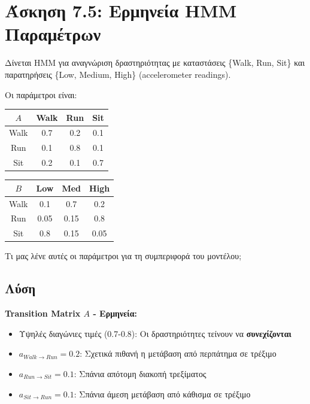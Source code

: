 \section{Άσκηση 7.5: Ερμηνεία HMM Παραμέτρων}

\begin{formulabox}[Εκφώνηση]
Δίνεται HMM για αναγνώριση δραστηριότητας με καταστάσεις \{Walk, Run, Sit\} και
παρατηρήσεις \{Low, Medium, High\} (accelerometer readings).

Οι παράμετροι είναι:
\begin{center}
\begin{tabular}{c|ccc}
$A$ & Walk & Run & Sit \\
\hline
Walk & 0.7 & 0.2 & 0.1 \\
Run & 0.1 & 0.8 & 0.1 \\
Sit & 0.2 & 0.1 & 0.7 \\
\end{tabular}
\quad
\begin{tabular}{c|ccc}
$B$ & Low & Med & High \\
\hline
Walk & 0.1 & 0.7 & 0.2 \\
Run & 0.05 & 0.15 & 0.8 \\
Sit & 0.8 & 0.15 & 0.05 \\
\end{tabular}
\end{center}

Τι μας λένε αυτές οι παράμετροι για τη συμπεριφορά του μοντέλου;
\end{formulabox}

\subsection*{Λύση}

\textbf{Transition Matrix $A$ - Ερμηνεία:}

\begin{itemize}
    \item Υψηλές διαγώνιες τιμές (0.7-0.8): Οι δραστηριότητες τείνουν να \textbf{συνεχίζονται}
    \item $a_{Walk \to Run} = 0.2$: Σχετικά πιθανή η μετάβαση από περπάτημα σε τρέξιμο
    \item $a_{Run \to Sit} = 0.1$: Σπάνια απότομη διακοπή τρεξίματος
    \item $a_{Sit \to Run} = 0.1$: Σπάνια άμεση μετάβαση από κάθισμα σε τρέξιμο
\end{itemize}

